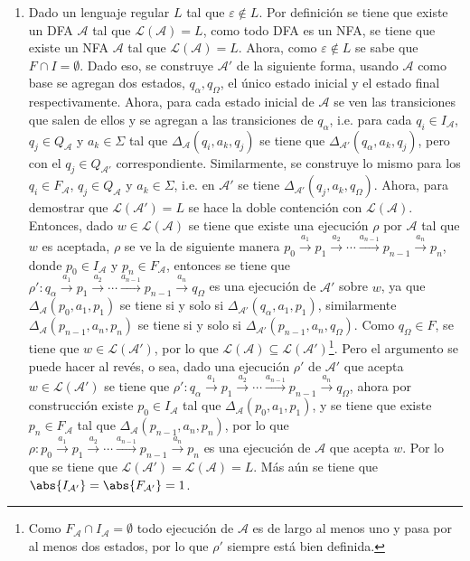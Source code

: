 \documentclass{homework}
\begin{document}
\begin{p2}
    \begin{sol}[2]
        \begin{enumerate}
            \item Dado un lenguaje regular \(L\) tal que \(\varepsilon\notin L\). Por definición se tiene que existe un DFA \(\mathcal{A}\) tal que \(\mathcal{L}(\mathcal{A})=L\), como todo DFA es un NFA, se tiene que existe un NFA \(\mathcal{A}\) tal que \(\mathcal{L}(\mathcal{A})=L\). Ahora, como \(\varepsilon\notin L\) se sabe que \(F\cap I=\emptyset\). Dado eso, se construye \(\mathcal{A}'\) de la siguiente forma, usando \(\mathcal{A}\) como base se agregan dos estados, \(q_\alpha,q_\Omega\), el único estado inicial y el estado final respectivamente. Ahora, para cada estado inicial de \(\mathcal{A}\) se ven las transiciones que salen de ellos y se agregan a las transiciones de \(q_\alpha\), i.e. para cada \(q_i\in I_\mathcal{A}\), \(q_j\in Q_\mathcal{A}\) y \(a_k\in\Sigma\) tal que \(\Delta_{\mathcal{A}}(q_i,a_k,q_j)\) se tiene que \(\Delta_{\mathcal{A}'}(q_\alpha,a_k,q_j)\), pero con el \(q_j\in Q_{\mathcal{A}'}\) correspondiente. Similarmente, se construye lo mismo para los \(q_i\in F_\mathcal{A}\), \(q_j\in Q_\mathcal{A}\) y \(a_k\in\Sigma\), i.e. en \(\mathcal{A}'\) se tiene \(\Delta_{\mathcal{A}'}(q_j,a_k,q_\Omega)\). Ahora, para demostrar que \(\mathcal{L}(\mathcal{A}')=L\) se hace la doble contención con \(\mathcal{L}(\mathcal{A})\). Entonces, dado \(w\in\mathcal{L}(\mathcal{A})\) se tiene que existe una ejecución \(\rho\) por \(\mathcal{A}\) tal que \(w\) es aceptada, \(\rho\) se ve la de siguiente manera \(p_0\xrightarrow{a_1}p_1\xrightarrow{a_2}\cdots\xrightarrow{a_{n-1}}p_{n-1}\xrightarrow{a_n}p_n\), donde \(p_0\in I_\mathcal{A}\) y \(p_n\in F_\mathcal{A}\), entonces se tiene que \(\rho':q_\alpha\xrightarrow{a_1}p_1\xrightarrow{a_2}\cdots\xrightarrow{a_{n-1}}p_{n-1}\xrightarrow{a_n}q_\Omega\) es una ejecución de \(\mathcal{A}'\) sobre \(w\), ya que \(\Delta_{\mathcal{A}}(p_0,a_1,p_1)\) se tiene si y solo si \(\Delta_{\mathcal{A}'}(q_\alpha,a_1,p_1)\), similarmente \(\Delta_{\mathcal{A}}(p_{n-1},a_n,p_n)\) se tiene si y solo si \(\Delta_{\mathcal{A}'}(p_{n-1},a_n,q_\Omega)\). Como \(q_\Omega\in F\), se tiene que \(w\in\mathcal{L}(\mathcal{A}')\), por lo que \(\mathcal{L}(\mathcal{A})\subseteq\mathcal{L}(\mathcal{A}')\)\footnote{Como \(F_\mathcal{A}\cap I_\mathcal{A}=\emptyset\) todo ejecución de \(\mathcal{A}\) es de largo al menos uno y pasa por al menos dos estados, por lo que \(\rho'\) siempre está bien definida.}. Pero el argumento se puede hacer al revés, o sea, dado una ejecución \(\rho'\) de \(\mathcal{A}'\) que acepta \(w\in\mathcal{L}(\mathcal{A}')\) se tiene que \(\rho':q_\alpha\xrightarrow{a_1}p_1\xrightarrow{a_2}\cdots\xrightarrow{a_{n-1}}p_{n-1}\xrightarrow{a_n}q_\Omega\), ahora por construcción existe \(p_0\in I_\mathcal{A}\) tal que \(\Delta_\mathcal{A}(p_0,a_1,p_1)\), y se tiene que existe \(p_n\in F_\mathcal{A}\) tal que \(\Delta_\mathcal{A}(p_{n-1},a_n,p_n)\), por lo que \(\rho:p_0\xrightarrow{a_1}p_1\xrightarrow{a_2}\cdots\xrightarrow{a_{n-1}}p_{n-1}\xrightarrow{a_n}p_n\) es una ejecución de \(\mathcal{A}\) que acepta \(w\). Por lo que se tiene que \(\mathcal{L}(\mathcal{A}')=\mathcal{L}(\mathcal{A})=L\). Más aún se tiene que \(\abs{I_{\mathcal{A}'}}=\abs{F_{\mathcal{A}'}}=1\).

\end{enumerate}
\end{sol}
\end{p2}
\end{document}
